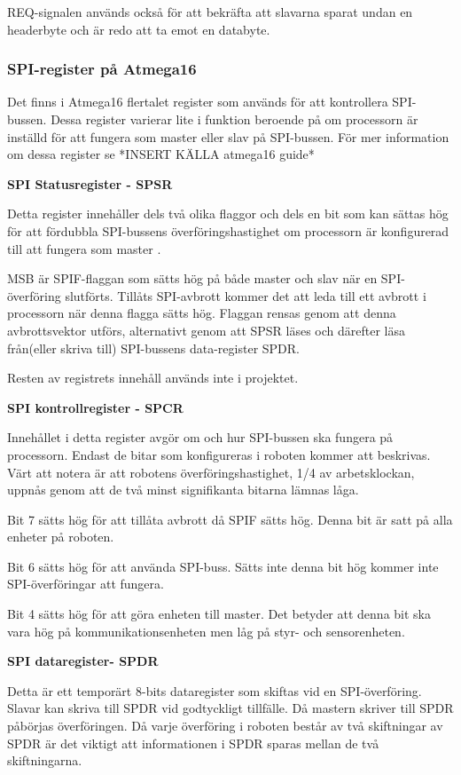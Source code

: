 REQ-signalen används också för att bekräfta att slavarna sparat undan en 
headerbyte och är redo att ta emot en databyte. 

\subsubsection{SPI-register på Atmega16}

Det finns i Atmega16 flertalet register som används för att kontrollera SPI-
bussen. Dessa register varierar lite i funktion beroende på om processorn är 
inställd för att fungera som master eller slav på SPI-bussen. För mer 
information om dessa register se *INSERT KÄLLA atmega16 guide*

\textbf{SPI Statusregister - SPSR}


Detta register innehåller dels två olika flaggor och dels en bit som kan 
sättas hög för att fördubbla SPI-bussens överföringshastighet om processorn 
är konfigurerad till att fungera som master . 

MSB är SPIF-flaggan som sätts hög på både master och slav när en 
SPI- överföring slutförts. Tillåts SPI-avbrott kommer 
det att leda till ett avbrott i processorn när denna flagga sätts hög. 
Flaggan rensas genom att denna avbrottsvektor utförs, alternativt genom att 
SPSR läses och därefter läsa från(eller skriva till) SPI-bussens data-register SPDR.

Resten av registrets innehåll används inte i projektet.

\textbf{SPI kontrollregister - SPCR}


Innehållet i detta register avgör om och hur SPI-bussen ska fungera på 
processorn. Endast de bitar som konfigureras i roboten kommer att beskrivas. 
Värt att notera är att robotens överföringshastighet, 1/4 av arbetsklockan, 
uppnås genom att de två minst signifikanta bitarna lämnas låga.

Bit 7 sätts hög för att tillåta avbrott då SPIF sätts hög. Denna bit är satt 
på alla enheter på roboten.

Bit 6 sätts hög för att använda SPI-buss. Sätts inte denna bit hög kommer 
inte SPI-överföringar att fungera.

Bit 4 sätts hög för att göra enheten till master. Det betyder att denna bit 
ska vara hög på kommunikationsenheten men låg på styr- och sensorenheten.

\textbf{SPI dataregister- SPDR}


Detta är ett temporärt 8-bits dataregister som skiftas vid en SPI-överföring. 
Slavar kan skriva till SPDR vid godtyckligt tillfälle. Då mastern skriver 
till SPDR påbörjas överföringen. Då varje överföring i roboten består av två 
skiftningar av SPDR är det viktigt att informationen i SPDR sparas mellan de 
två skiftningarna.


